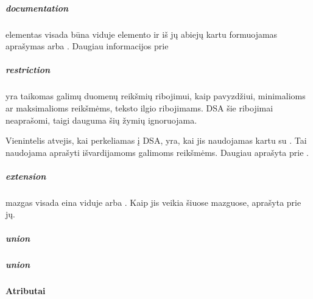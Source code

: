 \documentclass[letterpaper,10pt,lithuanian]{sphinxmanual}
\begin{document}
\subparagraph{documentation}
\label{\detokenize{schemos/xsd:documentation}}\label{\detokenize{schemos/xsd:xsd-documentation}}
\sphinxAtStartPar
{} elementas visada būna viduje {\hyperref[\detokenize{schemos/xsd:xsd-annotation}]{}} elemento ir iš jų abiejų kartu
formuojamas aprašymas \sphinxhyphen{} {\hyperref[\detokenize{dimensijos:model.description}]{}} arba {\hyperref[\detokenize{dimensijos:model.description}]{}}. Daugiau
informacijos prie {\hyperref[\detokenize{schemos/xsd:xsd-annotation}]{}}


\subparagraph{restriction}
\label{\detokenize{schemos/xsd:restriction}}\label{\detokenize{schemos/xsd:xsd-restriction}}
\sphinxAtStartPar
{} yra taikomas galimų duomenų reikšmių ribojimui, kaip pavyzdžiui, minimalioms ar
maksimalioms reikšmėms, teksto ilgio ribojimams. DSA šie ribojimai neaprašomi, taigi dauguma šių
žymių ignoruojama.

\sphinxAtStartPar
Vienintelis atvejis, kai  perkeliamas į DSA, yra, kai jis naudojamas kartu
su {\hyperref[\detokenize{schemos/xsd:xsd-enumeration}]{}}. Tai naudojama aprašyti išvardijamoms galimoms reikšmėms. Daugiau
aprašyta prie {\hyperref[\detokenize{schemos/xsd:xsd-enumeration}]{}}.


\subparagraph{extension}
\label{\detokenize{schemos/xsd:extension}}\label{\detokenize{schemos/xsd:xsd-extension}}
\sphinxAtStartPar
{} mazgas visada eina viduje  arba .
Kaip jis veikia šiuose mazguose, aprašyta prie jų.


\subparagraph{union}
\label{\detokenize{schemos/xsd:union}}\label{\detokenize{schemos/xsd:xsd-union}}

\subparagraph{union}
\label{\detokenize{schemos/xsd:xsd-appinfo}}\label{\detokenize{schemos/xsd:id15}}

\paragraph{Atributai}
\label{\detokenize{schemos/xsd:atributai}}
\end{document}
